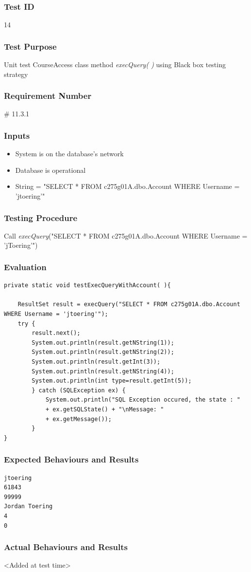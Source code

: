 \documentclass{article}
\begin{document}
\subsubsection{Test ID}
14

\subsubsection{Test Purpose}
Unit test CourseAccess class method \textit{execQuery( )} using Black box testing strategy

\subsubsection{Requirement Number}

\# 11.3.1

\subsubsection{Inputs}
\begin{itemize}
\item System is on the database's network
\item Database is operational
\item String = "SELECT * FROM c275g01A.dbo.Account WHERE Username = 'jtoering'"
\end{itemize}

\subsubsection{Testing Procedure}
Call \textit{execQuery}("SELECT * FROM c275g01A.dbo.Account WHERE Username = 'jToering'")

\subsubsection{Evaluation}
\begin{verbatim}
private static void testExecQueryWithAccount( ){

	ResultSet result = execQuery("SELECT * FROM c275g01A.dbo.Account WHERE Username = 'jtoering'");
	try {
    	result.next();
	    System.out.println(result.getNString(1));
    	System.out.println(result.getNString(2));
	    System.out.println(result.getInt(3));
	    System.out.println(result.getNString(4));
	    System.out.println(int type=result.getInt(5));
	    } catch (SQLException ex) {
  	        System.out.println("SQL Exception occured, the state : "
	   	    + ex.getSQLState() + "\nMessage: "
	   	    + ex.getMessage());
        }
}
\end{verbatim}

\subsubsection{Expected Behaviours and Results}
\begin{verbatim}
jtoering
61843
99999
Jordan Toering
4
0
\end{verbatim}

\subsubsection{Actual Behaviours and Results}
<Added at test time>
\end{document}
